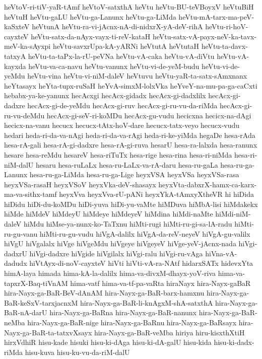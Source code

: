 {heVtoV-ri-tiV-yaR-tAmf
heVtoV-satxthA
heVtu
heVtu-BU-teVBoyxV
heVtuBiH
heVtuH
heVtu-gaLU
heVtu-ga-Lanunx
heVtu-ga-LiMda
heVtu-mA-tarx-ma-peV-kaSxteV
heVtunA
heVtu-ra-vi-jAcnx-nA-di-nidxrX-yA-deV-rihA
heVtu-ri-hoV-cayxteV
heVtu-satx-da-nAyx-vayx-ti-reV-kataH
heVtu-satx-vA-payx-neV-ka-tavx-meV-ka-sAyxpi
heVtu-savxrUpa-kA-yARNi
heVtutA
heVtutaH
heVtu-ta-davx-tatxyA
heVtu-ta-taPx-la-rU-peVNa
heVtu-vA-caka
heVtu-vA-diVtu
heVtu-vA-kayxda
heVtu-va-ca-navu
heVtu-vanunx
heVtu-vi-de-yeM-budu
heVtu-vi-de-yeMdu
heVtu-vina
heVtu-vi-niM-daleV
heVtuvu
heVtu-yaR-ta-satx-sAmxnanx
heYtasayx
heYta-tupx-ruSaH
heYvA-simxM-lolxVka
heYveY-na-mu-pa-ga-caCxti
hebabx-ya-ke-yanunx
hecAcxgi
hecAcx-gidadx
hecAcx-gi-dadxlilx
hecAcx-gi-dadxre
hecAcx-gi-de-yeMdu
hecAcx-gi-ruv
hecAcx-gi-ru-vu-da-riMda
hecAcx-gi-ru-vu-deMdu
hecAcx-gi-seV-ri-koMDu
hecAcx-gu-vudu
hecicxna
hecicx-na-dAgi
hecicx-na-vanu
hecucx
hecucx-tAtx-hoV-dare
hecucx-tatx-veyo
hecucx-vudu
hedari
heda-ri-da-va-nAgi
heda-ri-da-va-rAgi
heda-ri-ke-yiMda
hegaDe
hesa-rAda
hesa-rA-gali
hesa-rA-gi-dadxre
hesa-rA-gi-ruva
hesarU
hesa-ra-lalxda
hesa-ranunx
hesare
hesa-reMdu
hesareV
hesa-riTuTx
hesa-rige
hesa-rina
hesa-ri-niMda
hesa-ri-niM-dalU
hesaru
hesa-ruLaLx
hesa-ru-LaLx-va-rA-daru
hesa-ru-gaLa
hesa-ru-ga-Lanunx
hesa-ru-ga-LiMda
hesa-ru-ga-Lige
heyxVSA
heyxVSa
heyxVSa-rasa
heyxVSa-rasaH
heyxVSoV
heyxVka-deV-shasayx
heyxVta-dabxrX-hamx-ca-karx-ma-va-sithx-tamf
heyxVva
heyxVva-rU-pANi
heyxYkA-tAmxyXtheVR
hi
hiDida
hiDidu
hiDi-du-koMDu
hiDi-yuva
hiDi-yu-vaMte
hiMDuva
hiMbA-lisi
hiMdakekx
hiMde
hiMdeV
hiMdeyU
hiMdeye
hiMdeyeV
hiMdina
hiMdi-naMte
hiMdi-niM-daleV
hiMdu
hiMse-ya-nunx-ko-TaTxnu
hiMti-rugi
hiMti-ru-gi-sa-lA-radu
hiMti-ru-gu-vanu
hiMti-ru-gu-vudu
hiVgA-dalilx
hiVgA-da-reV-neyeV
hiVgA-gu-valilx
hiVgU
hiVgalalx
hiVge
hiVgeMdu
hiVgeye
hiVgeyeV
hiVge-yeV-jAcnx-nada
hiVgi-dadxrU
hiVgi-dadxre
hiVgide
hiVgilalx
hiVgi-ralu
hiVgi-ru-vAga
hiVna-vA-dadudx
hiVtAyx-di-noV-cayxteV
hiVti
hiVti-vA-ra-NAtf
hidarxSATx
hidevxYta
himA-laya
himada
hima-kA-la-dalilx
hima-va-divxM-dhayx-yoV-riva
hima-va-tapxrX-Baq-tiVnAM
hima-vatf
hima-va-tf-pa-vaRta
hiraNayx
hira-Nayx-gaBaR
hira-Nayx-ga-BaR-BeV-dAnAM
hira-Nayx-ga-BaR-barx-hamxnu
hira-Nayx-ga-BaR-keSxV-tarxjacnxM
hira-Nayx-ga-BaR-li-knAgxM-shA-satxthA
hira-Nayx-ga-BaR-nA-darU
hira-Nayx-ga-BaRna
hira-Nayx-ga-BaR-nanunx
hira-Nayx-ga-BaR-neMba
hira-Nayx-ga-BaR-nige
hira-Nayx-ga-BaRnu
hira-Nayx-ga-BaRsayx
hira-Nayx-ga-BaR-ta-tatxvXsayx
hira-Nayx-ga-BaR-veMba
hiriya
hiru-kisxthXtiH
hirxVdhiR
hisu-kade
hisuki
hisu-ki-dAga
hisu-ki-dA-galU
hisu-kida
hisu-ki-dadx-riMda
hisu-kuva
hisu-ku-vu-da-riM-dalU
}
